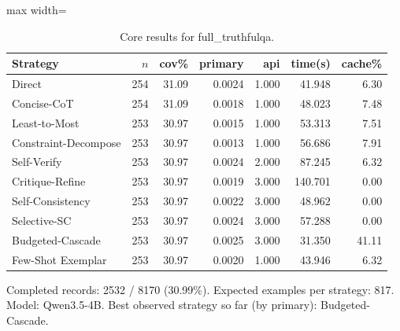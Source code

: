 \documentclass[10pt,twocolumn]{article}
\begin{document}
\begin{table}[t]
\centering
\caption{Core results for full\_truthfulqa.}
\label{tab:full_truthfulqa_core}
\begin{adjustbox}{max width=\textwidth}
\begin{tabular}{lrrrrrr}
\toprule
Strategy & $n$ & cov\% & primary & api & time(s) & cache\% \\
\midrule
Direct & 254 & 31.09 & 0.0024 & 1.000 & 41.948 & 6.30 \\
Concise-CoT & 254 & 31.09 & 0.0018 & 1.000 & 48.023 & 7.48 \\
Least-to-Most & 253 & 30.97 & 0.0015 & 1.000 & 53.313 & 7.51 \\
Constraint-Decompose & 253 & 30.97 & 0.0013 & 1.000 & 56.686 & 7.91 \\
Self-Verify & 253 & 30.97 & 0.0024 & 2.000 & 87.245 & 6.32 \\
Critique-Refine & 253 & 30.97 & 0.0019 & 3.000 & 140.701 & 0.00 \\
Self-Consistency & 253 & 30.97 & 0.0022 & 3.000 & 48.962 & 0.00 \\
Selective-SC & 253 & 30.97 & 0.0024 & 3.000 & 57.288 & 0.00 \\
Budgeted-Cascade & 253 & 30.97 & 0.0025 & 3.000 & 31.350 & 41.11 \\
Few-Shot Exemplar & 253 & 30.97 & 0.0020 & 1.000 & 43.946 & 6.32 \\
\bottomrule
\end{tabular}
\end{adjustbox}
\vspace{2pt}\parbox{0.98\textwidth}{\footnotesize Completed records: 2532 / 8170 (30.99\%). Expected examples per strategy: 817. Model: Qwen3.5-4B. Best observed strategy so far (by primary): Budgeted-Cascade.}
\end{table}
\end{document}
